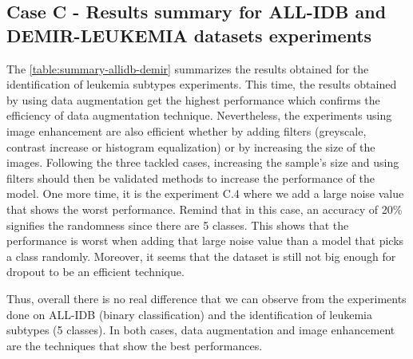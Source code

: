 \documentclass[11pt, openany]{report}
\theoremstyle{plain}
\theoremstyle{definition}
\theoremstyle{remark}
\begin{document}
\newpage
\subsection{Case C - Results summary for ALL-IDB and DEMIR-LEUKEMIA datasets experiments}


\vspace{0.5cm}

The \autoref{table:summary-allidb-demir} summarizes the results obtained for the identification of leukemia subtypes experiments. This time, the results obtained by using data augmentation get the highest performance which confirms the efficiency of data augmentation technique. Nevertheless, the experiments using image enhancement are also efficient whether by adding filters (greyscale, contrast increase or histogram equalization) or by increasing the size of the images. Following the three tackled cases, increasing the sample's size and using filters should then be validated methods to increase the performance of the model. One more time, it is the experiment C.4 where we add a large noise value that shows the worst performance. Remind that in this case, an accuracy of 20\% signifies the randomness since there are 5 classes. This shows that the performance is worst when adding that large noise value than a model that picks a class randomly. Moreover, it seems that the dataset is still not big enough for dropout to be an efficient technique.

Thus, overall there is no real difference that we can observe from the experiments done on ALL-IDB (binary classification) and the identification of leukemia subtypes (5 classes). In both cases, data augmentation and image enhancement are the techniques that show the best performances.    
\end{document}
